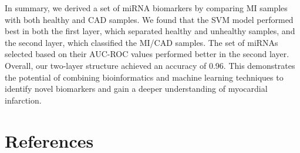 \documentclass[smallextended]{svjour3}       %
\begin{document}
In summary, we derived a set of miRNA biomarkers by comparing MI samples
with both healthy and CAD samples. We found that the SVM model performed
best in both the first layer, which separated healthy and unhealthy
samples, and the second layer, which classified the MI/CAD samples. The
set of miRNAs selected based on their AUC-ROC values performed better in
the second layer. Overall, our two-layer structure achieved an accuracy
of 0.96. This demonstrates the potential of combining bioinformatics and
machine learning techniques to identify novel biomarkers and gain a
deeper understanding of myocardial infarction.

\hypertarget{references}{%
\section*{References}\label{references}}
\end{document}
